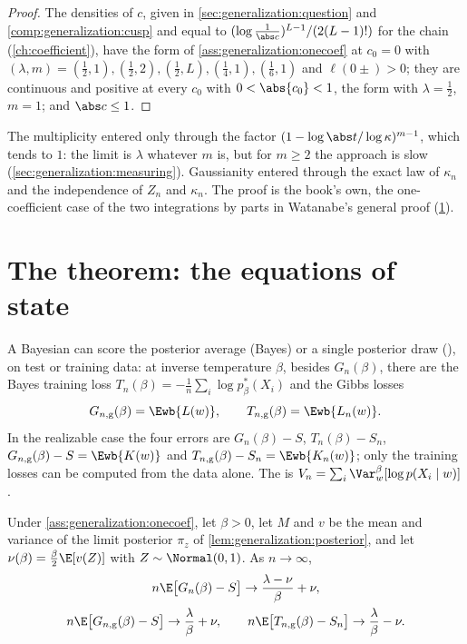 \begin{refsection}
\begin{proof}
The densities of $c$, given in \cref{sec:generalization:question} and \cref{comp:generalization:cusp} and equal to $(\log\frac1{\abs c})^{L-1}/(2(L-1)!)$ for the chain (\cref{ch:coefficient}), have the form of \cref{ass:generalization:onecoef} at $c_0=0$ with $(\lambda,m)=(\frac12,1),(\frac12,2),(\frac12,L),(\frac14,1),(\frac16,1)$ and $\ell(0\pm)>0$; they are continuous and positive at every $c_0$ with $0<\abs{c_0}<1$, the form with $\lambda=\frac12$, $m=1$; and $\abs c\le1$.
\end{proof}

The multiplicity entered only through the factor $(1-\log\abs t/\log\kappa)^{m-1}$, which tends to $1$: the limit is $\lambda$ whatever $m$ is, but for $m\ge2$ the approach is slow (\cref{sec:generalization:measuring}). Gaussianity entered through the exact law of $\kappa_n$ and the independence of $Z_n$ and $\kappa_n$. The proof is the book's own, the one-coefficient case of the two integrations by parts in Watanabe's general proof (\cref{sec:generalization:state}).

\section{The theorem: the equations of state}\label{sec:generalization:state}

A Bayesian can score the posterior average (Bayes) or a single posterior draw (), on test or training data: at inverse temperature $\beta$, besides $G_n(\beta)$, there are the Bayes training loss $T_n(\beta)=-\frac1n\sum_i\log p^*_\beta(X_i)$ and the Gibbs losses
\[
G_{n,\mathrm g}(\beta)=\Ewb{L(w)},\qquad T_{n,\mathrm g}(\beta)=\Ewb{L_n(w)} .
\]
In the realizable case the four errors are $G_n(\beta)-S$, $T_n(\beta)-S_n$, $G_{n,\mathrm g}(\beta)-S=\Ewb{K(w)}$ and $T_{n,\mathrm g}(\beta)-S_n=\Ewb{K_n(w)}$; only the training losses can be computed from the data alone. The  is $V_n=\sum_i\Var^\beta_w[\log p(X_i\mid w)]$.

\begin{proposition}\label{prop:generalization:quartet}
Under \cref{ass:generalization:onecoef}, let $\beta>0$, let $M$ and $v$ be the mean and variance of the limit posterior $\pi_z$ of \cref{lem:generalization:posterior}, and let $\nu(\beta)=\frac\beta2\E[v(Z)]$ with $Z\sim\Normal(0,1)$. As $n\to\infty$,
\begin{gather*}
n\E\bigl[G_n(\beta)-S\bigr]\to\frac{\lambda-\nu}\beta+\nu,\\
n\E\bigl[G_{n,\mathrm g}(\beta)-S\bigr]\to\frac\lambda\beta+\nu,\qquad n\E\bigl[T_{n,\mathrm g}(\beta)-S_n\bigr]\to\frac\lambda\beta-\nu .
\end{gather*}
\end{proposition}


\end{refsection}
